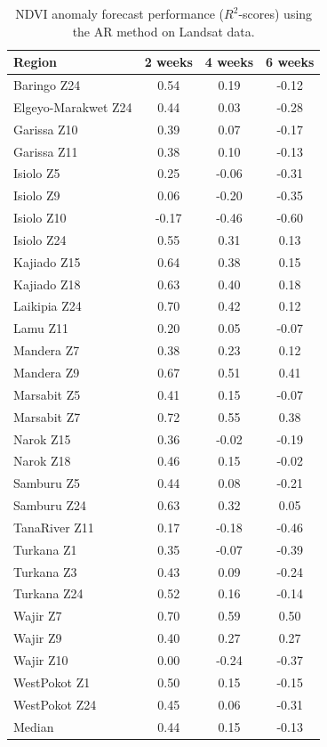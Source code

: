 \documentclass[review]{elsarticle}
\begin{document}
\begin{table}
	\footnotesize
	\caption{NDVI anomaly forecast performance ($R^2$-scores) using the AR method on Landsat data.} \label{tab:NDVI_Landsat_AR}
	\centering
	\begin{tabular}{l|ccc} 
		\toprule
		\textbf{Region}  &  \textbf{2 weeks} &  \textbf{4 weeks}  & \textbf{6 weeks}  \\
		\midrule
		Baringo Z24 	& 	0.54 	& 	0.19 	& 		-0.12\\
		Elgeyo-Marakwet Z24 	& 	0.44 	& 	0.03 	& 		-0.28\\
		Garissa Z10 	& 	0.39 	& 	0.07 	& 		-0.17\\
		Garissa Z11 	& 	0.38 	& 	0.10 	& 		-0.13\\
		Isiolo Z5 	& 	0.25 	&  	-0.06 	 & 	-0.31\\
		Isiolo Z9 	& 	0.06 	&  	-0.20 	& 	-0.35\\
		Isiolo Z10 	& 		-0.17 	&  	-0.46 	& 	-0.60\\
		Isiolo Z24 	& 	0.55 	& 	0.31 	& 	0.13\\
		Kajiado Z15 	& 	0.64 	& 	0.38 	& 	0.15\\
		Kajiado Z18 	& 	0.63 	& 	0.40 	& 	0.18\\
		Laikipia Z24 	& 	0.70 	& 	0.42 	& 	0.12\\
		Lamu Z11 	& 	0.20 	& 	0.05 	& 		-0.07\\
		Mandera Z7 	& 	0.38 	& 	0.23 	& 	0.12\\
		Mandera Z9 	& 	0.67 	& 	0.51 	& 	0.41\\
		Marsabit Z5 	& 	0.41 	& 	0.15 	& 		-0.07\\
		Marsabit Z7 	& 	0.72 	& 	0.55 	& 	0.38\\
		Narok Z15 	& 	0.36 	&  	-0.02 	& -0.19\\
		Narok Z18 	& 	0.46 	& 	0.15 	& 	-0.02\\
		Samburu Z5 	& 	0.44 	& 	0.08 	& 	-0.21\\
		Samburu Z24 	& 	0.63 	& 	0.32 	& 	0.05\\
		TanaRiver Z11 	& 	0.17 	&  	-0.18 	& 	-0.46\\
		Turkana Z1 	& 	0.35 	&  	-0.07 	& 	-0.39\\
		Turkana Z3 	& 	0.43 	& 	0.09 	& 		-0.24\\
		Turkana Z24 	& 	 	0.52 	& 	0.16 	&  	-0.14\\
		Wajir Z7 	& 	0.70 	& 	0.59 	& 	0.50\\
		Wajir Z9 	& 	0.40 	& 	0.27 	& 	0.27\\
		Wajir Z10 	&  	0.00 	&  	-0.24 	& 	-0.37\\
		WestPokot Z1 	& 	0.50 	& 	0.15 	& 		-0.15\\
		WestPokot Z24 	& 	0.45 	& 	0.06 	& 		-0.31\\
		\bottomrule
		Median & 0.44 & 0.15 &  -0.13\\
		\bottomrule
	\end{tabular}
\end{table}
\end{document}
